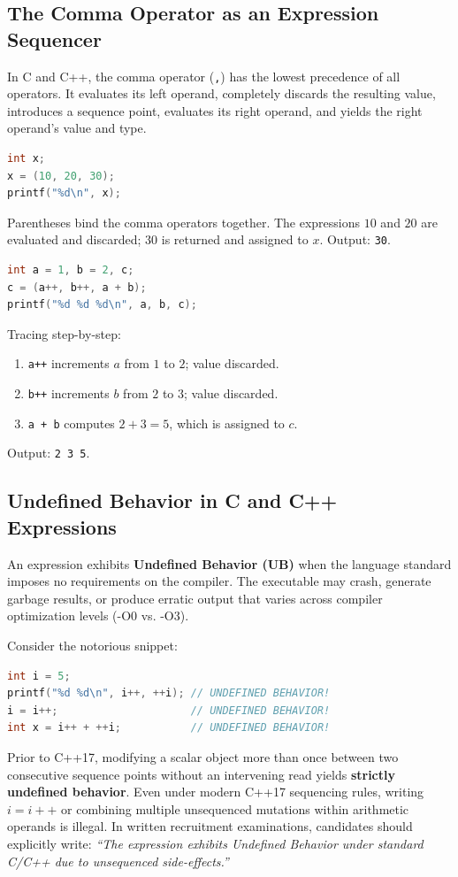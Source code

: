 \subsection{The Comma Operator as an Expression Sequencer}
In C and C++, the comma operator (\texttt{,}) has the lowest precedence of all operators. It evaluates its left operand, completely discards the resulting value, introduces a sequence point, evaluates its right operand, and yields the right operand's value and type.

\begin{lstlisting}[language=C]
int x;
x = (10, 20, 30);
printf("%d\n", x);
\end{lstlisting}
Parentheses bind the comma operators together. The expressions $10$ and $20$ are evaluated and discarded; $30$ is returned and assigned to $x$. Output: \texttt{30}.

\begin{lstlisting}[language=C]
int a = 1, b = 2, c;
c = (a++, b++, a + b);
printf("%d %d %d\n", a, b, c);
\end{lstlisting}
Tracing step-by-step:
\begin{enumerate}[leftmargin=*]
    \item \texttt{a++} increments $a$ from $1$ to $2$; value discarded.
    \item \texttt{b++} increments $b$ from $2$ to $3$; value discarded.
    \item \texttt{a + b} computes $2 + 3 = 5$, which is assigned to $c$.
\end{enumerate}
Output: \texttt{2 3 5}.

\subsection{Undefined Behavior in C and C++ Expressions}
An expression exhibits \textbf{Undefined Behavior (UB)} when the language standard imposes no requirements on the compiler. The executable may crash, generate garbage results, or produce erratic output that varies across compiler optimization levels (-O0 vs. -O3).

\begin{tcolorbox}[colback=codebg,colframe=quotetext,title=\textbf{Critical Examination Warning: Modification Without Sequencing}]
Consider the notorious snippet:
\begin{lstlisting}[language=C]
int i = 5;
printf("%d %d\n", i++, ++i); // UNDEFINED BEHAVIOR!
i = i++;                     // UNDEFINED BEHAVIOR!
int x = i++ + ++i;           // UNDEFINED BEHAVIOR!
\end{lstlisting}
Prior to C++17, modifying a scalar object more than once between two consecutive sequence points without an intervening read yields \textbf{strictly undefined behavior}. Even under modern C++17 sequencing rules, writing $i = i++$ or combining multiple unsequenced mutations within arithmetic operands is illegal. In written recruitment examinations, candidates should explicitly write: \textit{``The expression exhibits Undefined Behavior under standard C/C++ due to unsequenced side-effects.''}
\end{tcolorbox}

